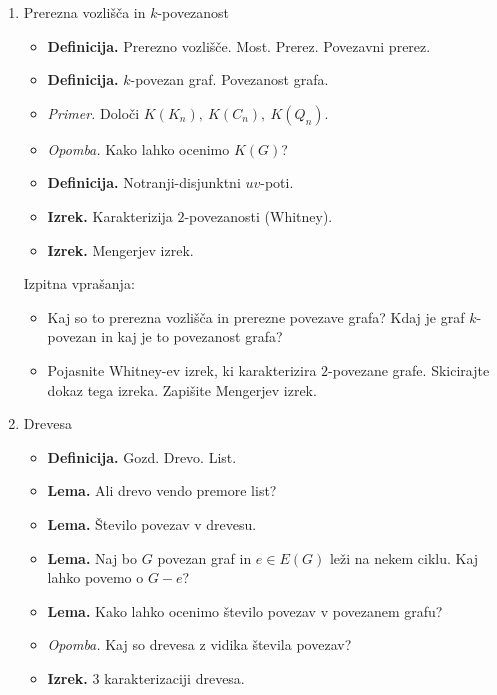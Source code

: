 \begin{enumerate}
    \item Prerezna vozlišča in \(k\)-povezanost
    \begin{itemize}
        \item \colorbox{purple!30}{\textbf{Definicija.}} Prerezno vozlišče. Most. Prerez. Povezavni prerez.
        \item \colorbox{purple!30}{\textbf{Definicija.}} \(k\)-povezan graf. Povezanost grafa.
        \item \colorbox{yellow!30}{\emph{Primer.}} Določi \(K(K_n), \ K(C_n), \ K(Q_n)\).
        \item \colorbox{yellow!30}{\emph{Opomba.}} Kako lahko ocenimo \(K(G)\)?
        \item \colorbox{purple!30}{\textbf{Definicija.}} Notranji-disjunktni \(uv\)-poti.
        \item \colorbox{blue!30}{\textbf{Izrek.}} Karakterizija \(2\)-povezanosti (Whitney).
        \item \colorbox{blue!30}{\textbf{Izrek.}} Mengerjev izrek.
    \end{itemize}

    Izpitna vprašanja:
    \begin{itemize}
        \item Kaj so to prerezna vozlišča in prerezne povezave grafa? Kdaj je graf \(k\)-povezan in kaj je to povezanost grafa?
        \item Pojasnite Whitney-ev izrek, ki karakterizira \(2\)-povezane grafe. Skicirajte dokaz tega izreka. Zapišite Mengerjev izrek.
    \end{itemize}  
    
    \item Drevesa
    \begin{itemize}
        \item \colorbox{purple!30}{\textbf{Definicija.}} Gozd. Drevo. List.
        \item \colorbox{blue!30}{\textbf{Lema.}} Ali drevo vendo premore list?
        \item \colorbox{blue!30}{\textbf{Lema.}} Število povezav v drevesu.
        \item \colorbox{blue!30}{\textbf{Lema.}} Naj bo \(G\) povezan graf in \(e \in E(G)\) leži na nekem ciklu. Kaj lahko povemo o \(G - e\)?
        \item \colorbox{blue!30}{\textbf{Lema.}} Kako lahko ocenimo število povezav v povezanem grafu?
        \item \colorbox{yellow!30}{\emph{Opomba.}} Kaj so drevesa z vidika števila povezav?
        \item \colorbox{blue!30}{\textbf{Izrek.}} 3 karakterizaciji drevesa.
    \end{itemize}


\end{enumerate}
